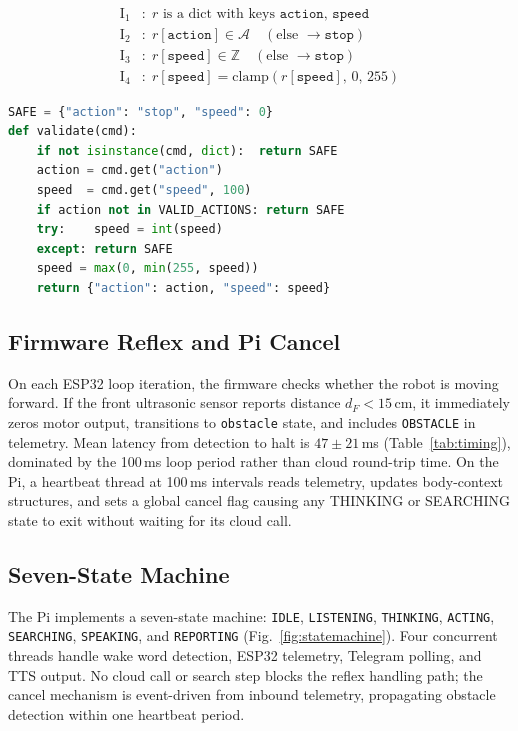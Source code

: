 \documentclass[conference]{IEEEtran}
\newcommand{\safe}{\texttt{stop}}
\begin{document}
\begin{align}
\text{I}_1&: \; r \text{ is a dict with keys } \texttt{action},\, \texttt{speed} \label{inv:dict}\\
\text{I}_2&: \; r[\texttt{action}] \in \mathcal{A} \quad(\text{else } \to \safe{}) \label{inv:action}\\
\text{I}_3&: \; r[\texttt{speed}] \in \mathbb{Z} \quad(\text{else } \to \safe{}) \label{inv:int}\\
\text{I}_4&: \; r[\texttt{speed}] = \text{clamp}(r[\texttt{speed}],\, 0,\, 255) \label{inv:range}
\end{align}

\begin{lstlisting}[language=Python, caption={Critic $V$: total, safe output (matches \texttt{safety\_validator.py})},
  label={lst:validator}, float=tp]
SAFE = {"action": "stop", "speed": 0}
def validate(cmd):
    if not isinstance(cmd, dict):  return SAFE
    action = cmd.get("action")
    speed  = cmd.get("speed", 100)
    if action not in VALID_ACTIONS: return SAFE
    try:    speed = int(speed)
    except: return SAFE
    speed = max(0, min(255, speed))
    return {"action": action, "speed": speed}
\end{lstlisting}

\subsection{Firmware Reflex and Pi Cancel}
\label{sec:reflex}

On each ESP32 loop iteration, the firmware checks whether the robot is moving forward. If the front ultrasonic sensor reports distance $d_F < 15$\,cm, it immediately zeros motor output, transitions to \texttt{obstacle} state, and includes \texttt{OBSTACLE} in telemetry. Mean latency from detection to halt is $47 \pm 21$\,ms (Table~\ref{tab:timing}), dominated by the 100\,ms loop period rather than cloud round-trip time. On the Pi, a heartbeat thread at 100\,ms intervals reads telemetry, updates body-context structures, and sets a global cancel flag causing any THINKING or SEARCHING state to exit without waiting for its cloud call.

\subsection{Seven-State Machine}
\label{sec:fsm}

The Pi implements a seven-state machine: \texttt{IDLE}, \texttt{LISTENING}, \texttt{THINKING}, \texttt{ACTING}, \texttt{SEARCHING}, \texttt{SPEAKING}, and \texttt{REPORTING} (Fig.~\ref{fig:statemachine}). Four concurrent threads handle wake word detection, ESP32 telemetry, Telegram polling, and TTS output. No cloud call or search step blocks the reflex handling path; the cancel mechanism is event-driven from inbound telemetry, propagating obstacle detection within one heartbeat period.
\end{document}
